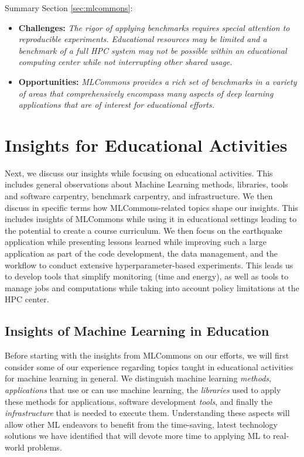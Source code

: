 \documentclass[utf8]{FrontiersinVancouver} %
\begin{document}
\begin{tcolorbox}
Summary Section \ref{sec:mlcommons}:

\begin{itemize}
\item {\bf Challenges:} {\it The rigor of applying benchmarks requires special attention to reproducible experiments. Educational resources may be limited and a benchmark of a full HPC system may not be possible within an educational computing center while not interrupting other shared usage.}
\item {\bf Opportunities:} {\it MLCommons provides a rich set of benchmarks in a variety of areas that comprehensively encompass many aspects of deep learning applications that are of interest for educational efforts.}
\end{itemize}
\end{tcolorbox}


\section{Insights for Educational Activities}
\label{sed:edu}

Next, we discuss our insights while focusing on educational activities. This includes general observations about Machine Learning methods, libraries, tools and software carpentry, benchmark carpentry, and infrastructure. We then discuss in specific terms how MLCommons-related topics shape our insights. This includes insights of MLCommons while using it in educational settings leading to the potential to create a course curriculum. We then focus on the earthquake application while presenting lessons learned while improving such a large application as part of the code development, the data management, and the workflow to conduct extensive hyperparameter-based experiments. This leads us to develop tools that simplify monitoring (time and energy), as well as tools to manage jobs and computations while taking into account policy limitations at the HPC center.



\subsection{Insights of Machine Learning in Education}
\label{sec:edu-ml}

Before starting with the insights from MLCommons on our efforts, we will first consider some of our experience regarding topics taught in educational activities for machine learning in general. We distinguish machine learning {\em methods}, {\em applications} that use or can use machine learning, the {\em libraries} used to apply these methods for applications, software development {\em tools}, and finally the {\em
infrastructure} that is needed to execute them. Understanding these aspects will allow other ML endeavors to benefit from the time-saving, latest technology solutions we have identified that will devote more time to applying ML to real-world problems.
\end{document}
